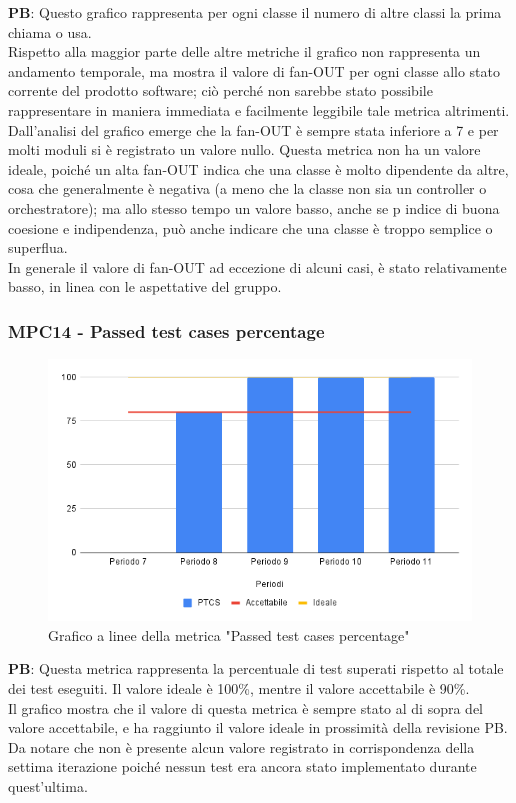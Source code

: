 \documentclass[10pt]{article}
\begin{document}
\begin{justify}
\textbf{PB}: Questo grafico rappresenta per ogni classe il numero di altre classi la prima chiama o usa.\\
Rispetto alla maggior parte delle altre metriche il grafico non rappresenta un andamento temporale, ma mostra il valore di fan-OUT per ogni classe allo stato 
corrente del prodotto software; ciò perché non sarebbe stato possibile rappresentare in maniera immediata e  facilmente leggibile tale metrica altrimenti.\\
Dall'analisi del grafico emerge che la fan-OUT è sempre stata inferiore a 7 e per molti moduli si è registrato un valore nullo. Questa metrica non ha un valore ideale,
poiché un alta fan-OUT indica che una classe è molto dipendente da altre, cosa che generalmente è negativa (a meno che la classe non sia un controller o orchestratore); 
ma allo stesso tempo un valore basso, anche se p indice di buona coesione e indipendenza, può anche indicare che una classe è troppo semplice o superflua.\\
In generale il valore di fan-OUT ad eccezione di alcuni casi, è stato relativamente basso, in linea con le aspettative del gruppo.\\


\subsubsection{MPC14 - Passed test cases percentage}

\begin{figure}[H]
  \centering
  \includegraphics[width=0.9\linewidth]{PTCP.png}
  \caption{Grafico a linee della metrica "Passed test cases percentage"}
\end{figure}

\textbf{PB}: Questa metrica rappresenta la percentuale di test superati rispetto al totale dei test eseguiti. Il valore ideale è 100\%, mentre il valore accettabile è 90\%.\\
Il grafico mostra che il valore di questa metrica è sempre stato al di sopra del valore accettabile, e ha raggiunto il valore ideale in prossimità della revisione PB.\\
Da notare che non è presente alcun valore registrato in corrispondenza della settima iterazione poiché nessun test era ancora stato implementato durante quest'ultima.\\


\end{justify}
\end{document}
